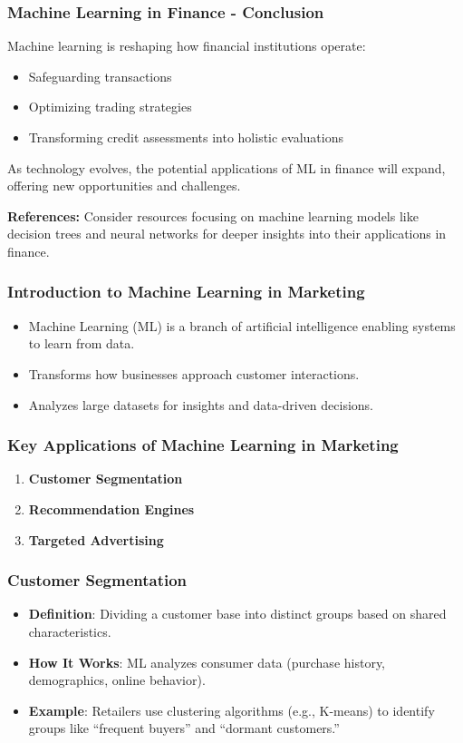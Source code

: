 \documentclass[aspectratio=169]{beamer}
\begin{document}
\begin{frame}[fragile]
    \frametitle{Machine Learning in Finance - Conclusion}
    Machine learning is reshaping how financial institutions operate:
    \begin{itemize}
        \item Safeguarding transactions
        \item Optimizing trading strategies
        \item Transforming credit assessments into holistic evaluations
    \end{itemize}

    As technology evolves, the potential applications of ML in finance will expand, offering new opportunities and challenges.
    
    \textbf{References:} Consider resources focusing on machine learning models like decision trees and neural networks for deeper insights into their applications in finance.
\end{frame}

\begin{frame}
    \titlepage
\end{frame}

\begin{frame}
    \frametitle{Introduction to Machine Learning in Marketing}
    \begin{itemize}
        \item Machine Learning (ML) is a branch of artificial intelligence enabling systems to learn from data.
        \item Transforms how businesses approach customer interactions.
        \item Analyzes large datasets for insights and data-driven decisions.
    \end{itemize}
\end{frame}

\begin{frame}
    \frametitle{Key Applications of Machine Learning in Marketing}
    \begin{enumerate}
        \item \textbf{Customer Segmentation}
        \item \textbf{Recommendation Engines}
        \item \textbf{Targeted Advertising}
    \end{enumerate}
\end{frame}

\begin{frame}
    \frametitle{Customer Segmentation}
    \begin{itemize}
        \item \textbf{Definition}: Dividing a customer base into distinct groups based on shared characteristics.
        \item \textbf{How It Works}: ML analyzes consumer data (purchase history, demographics, online behavior).
        \item \textbf{Example}: Retailers use clustering algorithms (e.g., K-means) to identify groups like “frequent buyers” and “dormant customers.”
    \end{itemize}
\end{frame}
\end{document}
